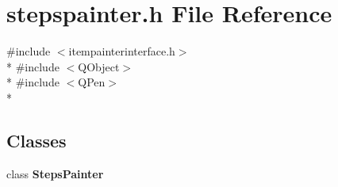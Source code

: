 \section{stepspainter.\+h File Reference}
\label{bk3_2curve_2painters_2stepspainter_8h}
{\ttfamily \#include $<$itempainterinterface.\+h$>$}\\*
{\ttfamily \#include $<$Q\+Object$>$}\\*
{\ttfamily \#include $<$Q\+Pen$>$}\\*
\subsection*{Classes}
\begin{DoxyCompactItemize}
\item 
class {\bf Steps\+Painter}
\end{DoxyCompactItemize}
